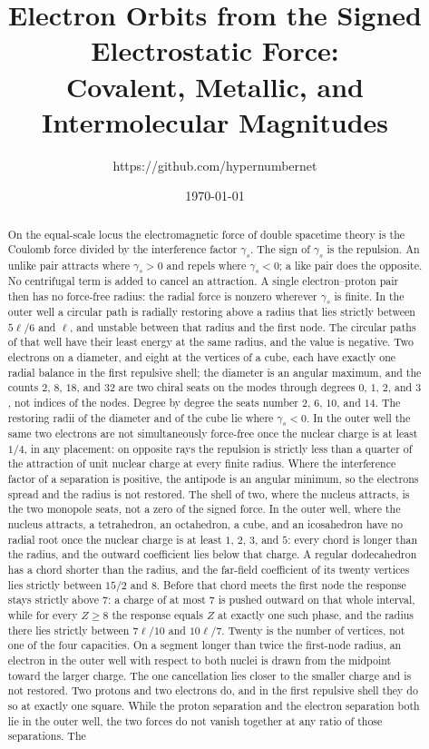 \documentclass[a4paper]{article}
\title{Electron Orbits from the Signed Electrostatic Force:\\
Covalent, Metallic, and Intermolecular Magnitudes}
\author{https://github.com/hypernumbernet}
\date{\today}
\begin{document}
\maketitle

\begin{abstract}
On the equal-scale locus the electromagnetic force of double spacetime theory is the Coulomb force divided by the interference factor \(\gamma_s\). The sign of \(\gamma_s\) is the repulsion. An unlike pair attracts where \(\gamma_s>0\) and repels where \(\gamma_s<0\); a like pair does the opposite. No centrifugal term is added to cancel an attraction. A single electron--proton pair then has no force-free radius: the radial force is nonzero wherever \(\gamma_s\) is finite. In the outer well a circular path is radially restoring above a radius that lies strictly between \(5\ell/6\) and \(\ell\), and unstable between that radius and the first node. The circular paths of that well have their least energy at the same radius, and the value is negative. Two electrons on a diameter, and eight at the vertices of a cube, each have exactly one radial balance in the first repulsive shell; the diameter is an angular maximum, and the counts \(2\), \(8\), \(18\), and \(32\) are two chiral seats on the modes through degrees \(0\), \(1\), \(2\), and \(3\), not indices of the nodes. Degree by degree the seats number \(2\), \(6\), \(10\), and \(14\). The restoring radii of the diameter and of the cube lie where \(\gamma_s<0\). In the outer well the same two electrons are not simultaneously force-free once the nuclear charge is at least \(1/4\), in any placement: on opposite rays the repulsion is strictly less than a quarter of the attraction of unit nuclear charge at every finite radius. Where the interference factor of a separation is positive, the antipode is an angular minimum, so the electrons spread and the radius is not restored. The shell of two, where the nucleus attracts, is the two monopole seats, not a zero of the signed force. In the outer well, where the nucleus attracts, a tetrahedron, an octahedron, a cube, and an icosahedron have no radial root once the nuclear charge is at least \(1\), \(2\), \(3\), and \(5\): every chord is longer than the radius, and the outward coefficient lies below that charge. A regular dodecahedron has a chord shorter than the radius, and the far-field coefficient of its twenty vertices lies strictly between \(15/2\) and \(8\). Before that chord meets the first node the response stays strictly above \(7\): a charge of at most \(7\) is pushed outward on that whole interval, while for every \(Z\ge 8\) the response equals \(Z\) at exactly one such phase, and the radius there lies strictly between \(7\ell/10\) and \(10\ell/7\). Twenty is the number of vertices, not one of the four capacities. On a segment longer than twice the first-node radius, an electron in the outer well with respect to both nuclei is drawn from the midpoint toward the larger charge. The one cancellation lies closer to the smaller charge and is not restored. Two protons and two electrons do, and in the first repulsive shell they do so at exactly one square. While the proton separation and the electron separation both lie in the outer well, the two forces do not vanish together at any ratio of those separations. The 
\end{abstract}
\end{document}
